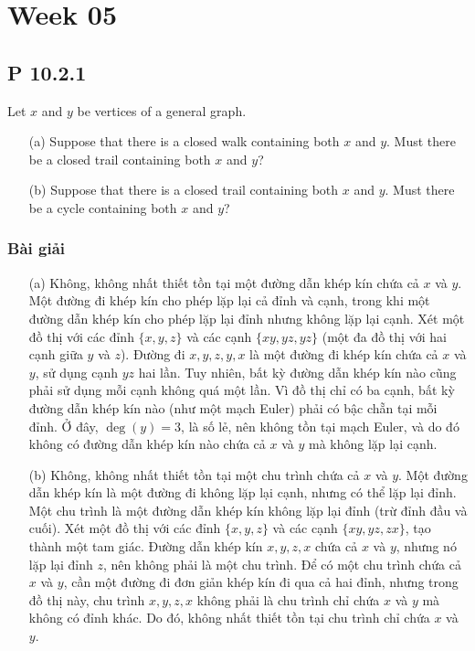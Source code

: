\documentclass[a4paper,12pt]{article}
\begin{document}
\section*{Week 05}
\subsection*{P 10.2.1}
Let \( x \) and \( y \) be vertices of a general graph.  
\begin{enumerate}
    \item[(a)] Suppose that there is a closed walk containing both \( x \) and \( y \). Must there be a closed trail containing both \( x \) and \( y \)?
    \item[(b)] Suppose that there is a closed trail containing both \( x \) and \( y \). Must there be a cycle containing both \( x \) and \( y \)?
\end{enumerate}

\subsubsection*{Bài giải}
\begin{enumerate}
    \item[(a)] Không, không nhất thiết tồn tại một đường dẫn khép kín chứa cả \( x \) và \( y \). Một đường đi khép kín cho phép lặp lại cả đỉnh và cạnh, trong khi một đường dẫn khép kín cho phép lặp lại đỉnh nhưng không lặp lại cạnh. Xét một đồ thị với các đỉnh \( \{x, y, z\} \) và các cạnh \( \{xy, yz, yz\} \) (một đa đồ thị với hai cạnh giữa \( y \) và \( z \)). Đường đi \( x, y, z, y, x \) là một đường đi khép kín chứa cả \( x \) và \( y \), sử dụng cạnh \( yz \) hai lần. Tuy nhiên, bất kỳ đường dẫn khép kín nào cũng phải sử dụng mỗi cạnh không quá một lần. Vì đồ thị chỉ có ba cạnh, bất kỳ đường dẫn khép kín nào (như một mạch Euler) phải có bậc chẵn tại mỗi đỉnh. Ở đây, \( \deg(y) = 3 \), là số lẻ, nên không tồn tại mạch Euler, và do đó không có đường dẫn khép kín nào chứa cả \( x \) và \( y \) mà không lặp lại cạnh.

    \item[(b)] Không, không nhất thiết tồn tại một chu trình chứa cả \( x \) và \( y \). Một đường dẫn khép kín là một đường đi không lặp lại cạnh, nhưng có thể lặp lại đỉnh. Một chu trình là một đường dẫn khép kín không lặp lại đỉnh (trừ đỉnh đầu và cuối). Xét một đồ thị với các đỉnh \( \{x, y, z\} \) và các cạnh \( \{xy, yz, zx\} \), tạo thành một tam giác. Đường dẫn khép kín \( x, y, z, x \) chứa cả \( x \) và \( y \), nhưng nó lặp lại đỉnh \( z \), nên không phải là một chu trình. Để có một chu trình chứa cả \( x \) và \( y \), cần một đường đi đơn giản khép kín đi qua cả hai đỉnh, nhưng trong đồ thị này, chu trình \( x, y, z, x \) không phải là chu trình chỉ chứa \( x \) và \( y \) mà không có đỉnh khác. Do đó, không nhất thiết tồn tại chu trình chỉ chứa \( x \) và \( y \).
\end{enumerate}
\end{document}
